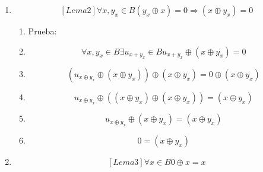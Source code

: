 \begin{enumerate}
\begin{enumerate}
\begin{enumerate}
\begin{enumerate}
        \begin{enumerate}
        \def\labelenumv{\arabic{enumv}.}
        \tightlist
        \item
          Prueba:
        \item
          \[\left( {x \oplus y_{x}} \right) \oplus {\left( {x \oplus y_{x}} \right) =}\]
        \item
          \[{= \left( {x \oplus \left( {y_{x} \oplus \left( {x \oplus y_{x}} \right)} \right)} \right)} =\]
        \item
          \[{= \left( {x \oplus \left( {\left( {y_{x} \oplus x} \right) \oplus y_{x}} \right)} \right)} =\]
        \item
          \[{= \left( {x \oplus \left( {0 \oplus y_{x}} \right)} \right)} =\]
        \item
          \[= \left( {x \oplus y_{x}} \right)\]
        \end{enumerate}
      \item
        \[\left\lbrack {{Lema}2} \right\rbrack\forall x,{y_{x} \in B}{\left( {y_{x} \oplus x} \right) = 0}\Rightarrow{\left( {x \oplus y_{x}} \right) = 0}\]

        \begin{enumerate}
        \def\labelenumv{\arabic{enumv}.}
        \tightlist
        \item
          Prueba:
        \item
          \[\forall x,{y_{x} \in B}\exists{u_{x + y_{x}} \in B}{{u_{x + y_{x}} \oplus \left( {x \oplus y_{x}} \right)} = 0}\]
        \item
          \[\left( {u_{x \oplus y_{x}} \oplus \left( {x \oplus y_{x}} \right)} \right) \oplus {\left( {x \oplus y_{x}} \right) = 0} \oplus \left( {x \oplus y_{x}} \right)\]
        \item
          \[u_{x \oplus y_{x}} \oplus {\left( {\left( {x \oplus y_{x}} \right) \oplus \left( {x \oplus y_{x}} \right)} \right) = \left( {x \oplus y_{x}} \right)}\]
        \item
          \[u_{x \oplus y_{x}} \oplus {\left( {x \oplus y_{x}} \right) = \left( {x \oplus y_{x}} \right)}\]
        \item
          \[0 = \left( {x \oplus y_{x}} \right)\]
        \end{enumerate}
      \item
        \[\left\lbrack {{Lema}3} \right\rbrack\forall{x \in B}0 \oplus {x = x}\]


\end{enumerate}
\end{enumerate}
\end{enumerate}
\end{enumerate}
